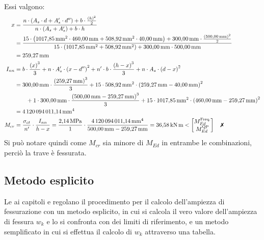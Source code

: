 Essi valgono:
\[
    \begin{split}
    x 
    &= \frac{ n \cdot \left( A_{s} \cdot d + A^{\prime}_{s} \cdot d^{\prime\prime} \right) + b \cdot \frac{ \left( h \right) ^{ 2 } }{ 2 } }{ n \cdot \left( A_{s} + A^{\prime}_{s} \right) + b \cdot h } \\
    &= \frac{ 15 \cdot \left( \SI{1017.85}{\milli\metre\squared} \cdot \SI{460.00}{\milli\metre} + \SI{508.92}{\milli\metre\squared} \cdot \SI{40.00}{\milli\metre} \right) + \SI{300.00}{\milli\metre} \cdot \frac{ \left( \SI{500.00}{\milli\metre} \right) ^{ 2 } }{ 2 } }{ 15 \cdot \left( \SI{1017.85}{\milli\metre\squared} + \SI{508.92}{\milli\metre\squared} \right) + \SI{300.00}{\milli\metre} \cdot \SI{500.00}{\milli\metre} } \\
    &= \SI{259.27}{\milli\metre}  \\
    I_{nn} 
    &= b \cdot \frac{ \left( x \right) ^{ 3 } }{ 3 } + n \cdot A^{\prime}_{s} \cdot \left( x - d^{\prime\prime} \right) ^{ 2 } + n^{\prime} \cdot b \cdot \frac{ \left( h - x \right) ^{ 3 } }{ 3 } + n \cdot A_{s} \cdot \left( d - x \right) ^{ 2 } \\
    &= \SI{300.00}{\milli\metre} \cdot \frac{ \left( \SI{259.27}{\milli\metre} \right) ^{ 3 } }{ 3 } + 15 \cdot \SI{508.92}{\milli\metre\squared} \cdot \left( \SI{259.27}{\milli\metre} - \SI{40.00}{\milli\metre} \right) ^{ 2 } \\
    & \quad\quad + 1 \cdot \SI{300.00}{\milli\metre} \cdot \frac{ \left( \SI{500.00}{\milli\metre} - \SI{259.27}{\milli\metre} \right) ^{ 3 } }{ 3 } + 15 \cdot \SI{1017.85}{\milli\metre\squared} \cdot \left( \SI{460.00}{\milli\metre} - \SI{259.27}{\milli\metre} \right) ^{ 2 } \\
    &= \SI{4120094011.14}{\milli\metre\tothe{4}}  \\
    M_{cr} 
    &= \frac{ \sigma_{ct} }{ n^{\prime} } \cdot \frac{ I_{nn} }{ h - x }  
    = \frac{ \SI{2.14}{\mega\pascal} }{ 1 } \cdot \frac{ \SI{4120094011.14}{\milli\metre\tothe{4}} }{ \SI{500.00}{\milli\metre} - \SI{259.27}{\milli\metre} } 
    = \SI{36.58}{\kilo\newton\metre}  < 
        \begin{bmatrix}
            M_{Ed}^\textup{Freq.} \\
            M_{Ed}^\textup{QP}
        \end{bmatrix} \quad \notchecked
    \end{split}
\]
Si può notare quindi come $M_{cr}$ sia minore di $M_{Ed}$ in entrambe le combinazioni, perciò la trave è fessurata. 
\subsection{Metodo esplicito}
Le  ai capitoli  e  regolano il procedimento per il calcolo dell'ampiezza di fessurazione con un metodo esplicito, in cui si calcola il vero valore dell'ampiezza di fessura $w_k$ e lo si confronta con dei limiti di riferimento, e un metodo semplificato in cui si effettua il calcolo di $w_k$ attraverso una tabella.

